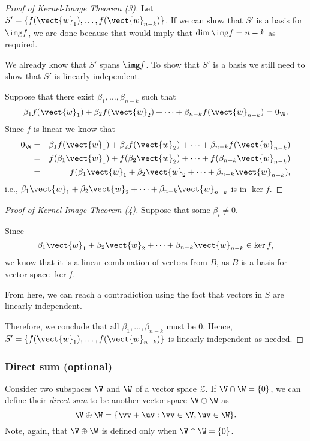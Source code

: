 \begin{frame}
  \begin{proof}[Proof of Kernel-Image Theorem (3)]
    {\small
      \pause
      Let $S'=\{f(\vect{w}_1),\ldots,f(\vect{w}_{n-k})\}$.  If we can show
      that $S'$ is a basis for $\img f$, we are done because that would
      imply that $\dim\img f=n-k$ as required.

      \pause
      We already know that $S'$ spans $\img f$.
      \pause To show that $S'$ is a
      basis we still need to show that $S'$ is linearly independent.

      \pause
      Suppose that there exist $\beta_1,\ldots,\beta_{n-k}$ such that
      \[
      \beta_1f(\vect{w}_1) + \beta_2f(\vect{w}_2) + \cdots +
      \beta_{n-k}f(\vect{w}_{n-k}) = 0_\W.
      \]
      \pause
      Since $f$ is linear we know that
      \begin{eqnarray*}
        0_\W &=&
        \beta_1f(\vect{w}_1) + \beta_2f(\vect{w}_2) + \cdots +
        \beta_{n-k}f(\vect{w}_{n-k})\\
        &=&
        f(\beta_1\vect{w}_1) + f(\beta_2\vect{w}_2) + \cdots +
        f(\beta_{n-k}\vect{w}_{n-k})\\
        &=&
        f(\beta_1\vect{w}_1 + \beta_2\vect{w}_2 + \cdots +
        \beta_{n-k}\vect{w}_{n-k}),
      \end{eqnarray*}
      i.e., $\beta_1\vect{w}_1 + \beta_2\vect{w}_2 + \cdots +
      \beta_{n-k}\vect{w}_{n-k}$ is in $\ker f$.
    }
  \end{proof}
\end{frame}

\begin{frame}
  \begin{proof}[Proof of Kernel-Image Theorem (4)]
    {\small
      Suppose that some $\beta_i\neq 0$.

      Since
      \[
      \beta_1\vect{w}_1 + \beta_2\vect{w}_2 + \cdots +
      \beta_{n-k}\vect{w}_{n-k} \in \ker f,
      \]
      we know that it is a linear combination of vectors from $B$, as
      $B$ is a basis for vector space $\ker f$.

      \pause From here, we can reach a contradiction using the fact
      that vectors in $S$ are linearly independent.

      \pause
      Therefore, we conclude that all $\beta_1,\ldots,\beta_{n-k}$
      must be 0.  Hence,
      $S'=\{f(\vect{w}_1),\ldots,f(\vect{w}_{n-k})\}$ is linearly
      independent as needed.
    }
  \end{proof}
\end{frame}

\begin{frame}
\frametitle{Direct sum (optional)}

Consider two subspaces $\V$ and $\W$ of a vector space ${\mathcal Z}$.
If $\V\cap\W=\{0\}$, we can define their {\em direct sum} to be
another vector space $\V\oplus\W$ as
\[
\V\oplus\W = \{\vv+\uv : \vv\in\V, \uv\in\W\}.
\]
Note, again, that $\V\oplus\W$ is defined only when $\V\cap\W=\{0\}$.
\end{frame}

